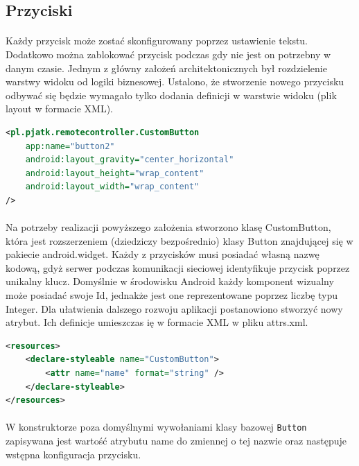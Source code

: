 \subsection{Przyciski}
\paragraph{}
Każdy przycisk może zostać skonfigurowany poprzez ustawienie tekstu. Dodatkowo można zablokować przycisk podczas gdy nie jest on potrzebny w danym czasie. 
Jednym z główny założeń architektonicznych był rozdzielenie warstwy widoku od logiki biznesowej. Ustalono, że stworzenie nowego przycisku odbywać się będzie wymagało tylko dodania definicji w warstwie widoku (plik layout w formacie XML).

\begin{lstlisting}[language=XML]
<pl.pjatk.remotecontroller.CustomButton
    app:name="button2"
    android:layout_gravity="center_horizontal"
    android:layout_height="wrap_content"
    android:layout_width="wrap_content"
/>
\end{lstlisting}
\paragraph{}
Na potrzeby realizacji powyższego założenia stworzono klasę CustomButton, która jest rozszerzeniem (dziedziczy bezpośrednio) klasy Button znajdującej się w pakiecie  android.widget.
\newline
Każdy z przycisków musi posiadać własną nazwę kodową, gdyż serwer podczas komunikacji sieciowej identyfikuje przycisk poprzez unikalny klucz. Domyślnie w środowisku Android każdy komponent wizualny może posiadać swoje Id, jednakże jest one reprezentowane poprzez liczbę typu Integer.
Dla ułatwienia dalszego rozwoju aplikacji postanowiono stworzyć nowy atrybut. Ich definicje umieszczas ię w formacie XML w pliku attrs.xml.

\begin{lstlisting}[language=XML]
<resources>
    <declare-styleable name="CustomButton">
        <attr name="name" format="string" />
    </declare-styleable>
</resources>
\end{lstlisting}

\paragraph{}
W konstruktorze poza domyślnymi wywołaniami klasy bazowej \texttt{Button} zapisywana jest wartość atrybutu name do zmiennej o tej nazwie oraz następuje wstępna konfiguracja przycisku.

